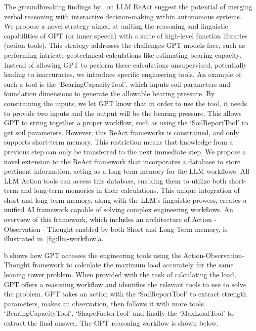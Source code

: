 \documentclass[12pt]{article}
\begin{document}
The groundbreaking findings by~\textcite{yao2022react} on LLM ReAct suggest the potential of merging verbal reasoning with interactive decision-making within autonomous systems. We propose a novel strategy aimed at uniting the reasoning and linguistic capabilities of GPT (or inner speech) with a suite of high-level function libraries (action tools). This strategy addresses the challenges GPT models face, such as performing intricate geotechnical calculations like estimating bearing capacity. Instead of allowing GPT to perform these calculations unsupervised, potentially leading to inaccuracies, we introduce specific engineering tools. An example of such a tool is the `BearingCapacityTool', which inputs soil parameters and foundation dimensions to generate the allowable bearing pressure. By constraining the inputs, we let GPT know that in order to use the tool, it needs to provide two inputs and the output will be the bearing pressure. This allows GPT to string together a proper workflow, such as using the `SoilReportTool' to get soil parameters. However, this ReAct frameworks is constrained, and only supports short-term memory. This restriction means that knowledge from a previous step can only be transferred to the next immediate step. We propose a novel extension to the ReAct framework that incorporates a database to store pertinent information, acting as a long-term memory for the LLM workflows. All LLM Action tools can access this database, enabling them to utilize both short-term and long-term memories in their calculations. This unique integration of short and long-term memory, along with the LLM's linguistic prowess, creates a unified AI framework capable of solving complex engineering workflows. An overview of this framework, which includes an architecture of Action - Observation - Thought enabled by both Short and Long Term memory, is illustrated in~\cref{fig:llm-workflow}a. 

b shows how GPT accesses the engineering tools using the Action-Observation-Thought framework to calculate the maximum load accurately for the same leaning tower problem. When provided with the task of calculating the load, GPT offers a reasoning workflow and identifies the relevant tools to use to solve the problem. GPT takes an action with the `SoilReportTool' to extract strength parameters, makes an observation, then follows it with more tools `BearingCapacityTool', `ShapeFactorTool' and finally the `MaxLoadTool' to extract the final answer. The GPT reasoning workflow is shown below.
\end{document}
